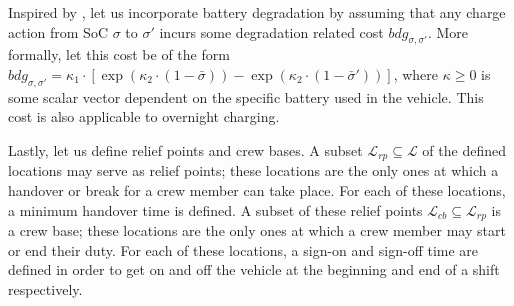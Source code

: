 \documentclass[]{article}
\begin{document}
Inspired by \citet{vanKootenNiekerk2017}, let us incorporate battery degradation by assuming that any charge action from SoC $\sigma$ to $\sigma'$ incurs some degradation related cost $bdg_{\sigma,\sigma'}$. More formally, let this cost be of the form $bdg_{\sigma,\sigma'} = \kappa_1 \cdot [\exp(\kappa_2 \cdot (1 - \bar{\sigma})) - \exp(\kappa_2 \cdot (1 - \bar{\sigma}'))]$, where $\kappa \geq 0$ is some scalar vector dependent on the specific battery used in the vehicle. This cost is also applicable to overnight charging.

Lastly, let us define relief points and crew bases. A subset $\mathcal{L}_{rp} \subseteq \mathcal{L}$ of the defined locations may serve as relief points; these locations are the only ones at which a handover or break for a crew member can take place. For each of these locations, a minimum handover time is defined. A subset of these relief points $\mathcal{L}_{cb} \subseteq \mathcal{L}_{rp}$ is a crew base; these locations are the only ones at which a crew member may start or end their duty. For each of these locations, a sign-on and sign-off time are defined in order to get on and off the vehicle at the beginning and end of a shift respectively. \newline
\end{document}
